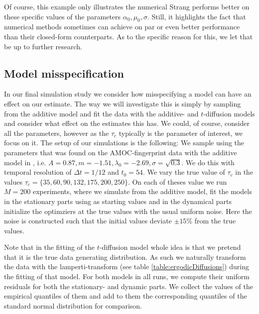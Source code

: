 Of course, this example only illustrates the numerical Strang performs better on these specific values of the parameters $\alpha_0, \mu_0, \sigma$. Still, it highlights the fact that numerical methods sometimes can achieve on par or even better performance than their closed-form counterparts. As to the specific reason for this, we let that be up to further research.
\subsection{Model misspecification}
In our final simulation study we consider how misspecifying a model can have an effect on our estimate. The way we will investigate this is simply by sampling from the additive model and fit the data with the additive- and $t$-diffusion models and consider what effect on the estimates this has. We could, of course, consider all the parameters, however as the $\tau_c$ typically is the parameter of interest, we focus on it. The setup of our simulations is the following: We sample using the parameters that was found on the AMOC-fingerprint data with the additive model in \cite[figure 6]{Ditlevsen2023}, i.e. $A = 0.87, m = -1.51, \lambda_0 = -2.69, \sigma = \sqrt{0.3}$. We do this with temporal resolution of $\Delta t = 1/12$ and $t_0 =54$. We vary the true value of $\tau_c$ in the values $\tau_c = \{35, 60, 90, 132, 175, 200, 250\}$. On each of theses value we run $M = 200$ experiments, where we simulate from the additive model, fit the models in the stationary parts using \cite[equation (S4-S6)]{DitlevsenSupplementary} as starting values and in the dynamical parts initialize the optimziers at the true values with the usual uniform noise. Here the noise is constructed such that the initial values deviate $\pm 15\%$ from the true values.

Note that in the fitting of the $t$-diffusion model whole idea is that we pretend that it is the true data generating distribution. As such we naturally transform the data with the lamperti-transform (see table \ref{table:ergodicDiffusions}) during the fitting of that model. For both models in all runs, we compute their uniform residuals for both the stationary- and dynamic parts. We collect the values of the empirical quantiles of them and add to them the corresponding quantiles of the standard normal distribution for comparison.

